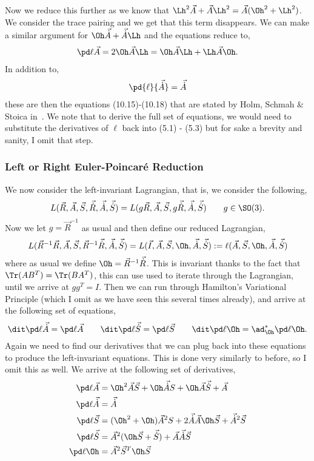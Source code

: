 Now we reduce this further as we know that $\Lh^2\vec A + \vec A\Lh^2 = \vec A(\Oh^2 + \Lh^2)$. We consider the trace pairing and we get that this term disappears. We can make a similar argument for $\Oh\vec{\dot A} + \vec{\dot A}\Lh$ and the equations reduce to,
\begin{align}
  \pd \ell {\vec A} = 2\Oh \vec A\Lh = \Oh\vec A\Lh + \Lh\vec A\Oh.
\end{align}
In addition to,
\begin{align}
  \pd{\ell}{\vec{\dot A}} = \vec{\dot A}
\end{align}
these are then the equations (10.15)-(10.18) that are stated by Holm, Schmah \& Stoica in~\cite{holm_schmah_stoica_2009}. We note that to derive the full set of equations, we would need to substitute the derivatives of $\ell$ back into (5.1) - (5.3) but for sake a brevity and sanity, I omit that step.\\

\noindent
\subsubsection{Left or Right Euler-Poincar\'e Reduction}

We now consider the left-invariant Lagrangian, that is, we consider the following,
$$ L(\vec R, \vec A, \vec S, \vec{\dot R}, \vec{\dot A}, \vec{\dot S}) = L(g\vec R, \vec A, \vec S, g\vec{\dot R}, \vec{\dot A}, \vec{\dot S}) \qquad g \in \SO(3). $$
Now we let $g = \vec R^{-1}$ as usual and then define our reduced Lagrangian,
$$ L(\vec R^{-1}\vec R, \vec A, \vec S, \vec R^{-1}\vec{\dot R}, \vec{\dot A}, \vec{\dot S}) = L(\vec I, \vec A, \vec S, \Oh, \vec{\dot A}, \vec{\dot S}) := \ell(\vec A, \vec S, \Oh, \vec{\dot A}, \vec{\dot S})$$
where as usual we define $\Oh = \vec R^{-1}\vec{\dot R}$. This is invariant thanks to the fact that $\Tr(AB^T) = \Tr(BA^T)$, this can use used to iterate through the Lagrangian, until we arrive at $gg^T = I$. Then we can run through Hamilton's Variational Principle (which I omit as we have seen this several times already), and arrive at the following set of equations,
$$ \dit \pd \ell {\vec{\dot A}} = \pd \ell {\vec A} \qquad \dit \pd \ell {\vec{\dot S}} = \pd \ell {\vec S} \qquad \dit \pd \ell \Oh = \ad_{\Oh}^* \pd \ell \Oh. $$
Again we need to find our derivatives that we can plug back into these equations to produce the left-invariant equations. This is done very similarly to before, so I omit this as well. We arrive at the following set of derivatives,
\begin{align*}
  \pd \ell {\vec A} &= \Oh^2 \vec A\vec S + \Oh \vec {\dot A}S + \Oh \vec A\vec {\dot S} + \vec A \\
  \pd \ell {\vec {\dot A}} &= \vec {\dot A} \\
  \pd \ell {\vec S} &= (\Oh^2 + \Oh)\vec A^2S + 2\vec {\dot A}\vec A \Oh \vec S + \vec {\dot A}^2 \vec S\\
  \pd \ell {\vec {\dot S}} &= \vec A^2(\Oh\vec S + \vec {\dot S}) + \vec A \vec {\dot A}\vec S \\
  \pd \ell \Oh &= \vec A^2 \vec S^T \Oh \vec S
\end{align*}

